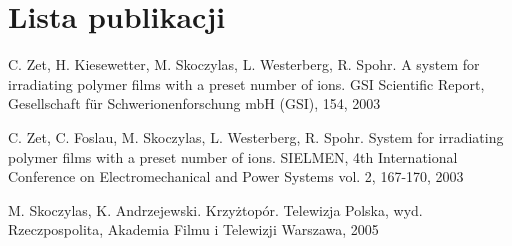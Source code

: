 \chapter*{Lista publikacji}
\thispagestyle{empty}
\pagestyle{empty}

\par
\hspace{0.6cm}C. Zet, H. Kiesewetter, M. Skoczylas, L. Westerberg, R. Spohr. A system for irradiating polymer films with a preset number of ions. GSI Scientific Report, Gesellschaft f\"ur Schwerionenforschung mbH (GSI), 154, 2003

\par
C. Zet, C. Foslau, M. Skoczylas, L. Westerberg, R. Spohr. System for irradiating polymer films with a preset number of ions. SIELMEN, 4th International Conference on Electromechanical and Power Systems  vol. 2, 167-170, 2003

\par M. Skoczylas, K. Andrzejewski. Krzyżtopór. Telewizja Polska, wyd. Rzeczpospolita, Akademia Filmu i Telewizji Warszawa, 2005
